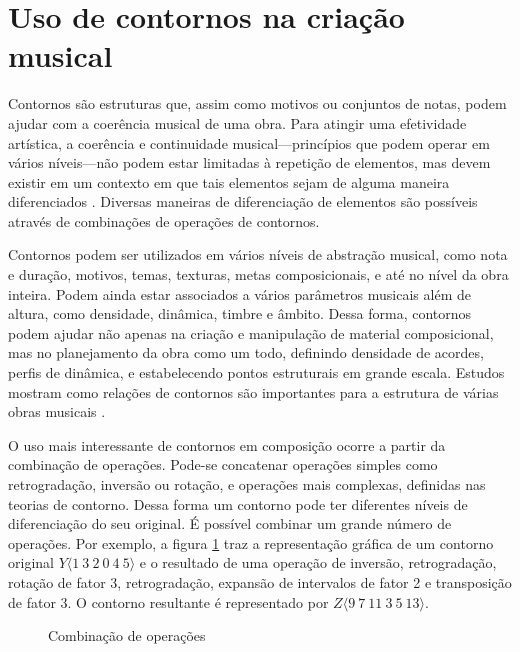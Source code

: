 \section{Uso de contornos na criação musical}
\label{sec:uso-de-contornos}

Contornos são estruturas que, assim como motivos ou conjuntos de
notas, podem ajudar com a coerência musical de uma obra. Para atingir
uma efetividade artística, a coerência e continuidade
musical---princípios que podem operar em vários níveis---não podem
estar limitadas à repetição de elementos, mas devem existir em um
contexto em que tais elementos sejam de alguma maneira diferenciados
\cite[p. 296]{kliewer75:aspects}. Diversas maneiras de diferenciação
de elementos são possíveis através de combinações de operações de
contornos.

Contornos podem ser utilizados em vários níveis de abstração musical,
como nota e duração, motivos, temas, texturas, metas composicionais, e
até no nível da obra inteira. Podem ainda estar associados a vários
parâmetros musicais além de altura, como densidade, dinâmica, timbre e
âmbito. Dessa forma, contornos podem ajudar não apenas na criação e
manipulação de material composicional, mas no planejamento da obra
como um todo, definindo densidade de acordes, perfis de dinâmica, e
estabelecendo pontos estruturais em grande escala. Estudos mostram
como relações de contornos são importantes para a estrutura de várias
obras musicais
\cite{friedmann85:methodology,clifford95:contour,beard03:contour}.

O uso mais interessante de contornos em composição ocorre a partir da
combinação de operações. Pode-se concatenar operações simples como
retrogradação, inversão ou rotação, e operações mais complexas,
definidas nas teorias de contorno. Dessa forma um contorno pode ter
diferentes níveis de diferenciação do seu original. É possível
combinar um grande número de operações. Por exemplo, a figura
\ref{fig:combinacao-operacoes} traz a representação gráfica de um
contorno original $Y\langle1\:3\:2\:0\:4\:5\rangle$ e o resultado de
uma operação de inversão, retrogradação, rotação de fator 3,
retrogradação, expansão de intervalos de fator 2 e transposição de
fator 3. O contorno resultante é representado por
$Z\langle9\:7\:11\:3\:5\:13\rangle$.

\begin{figure}
  \centering
  \caption{Combinação de operações}
  \label{fig:combinacao-operacoes}
\end{figure}

